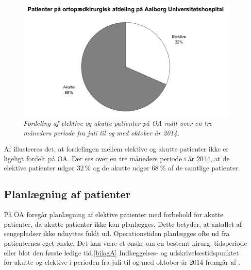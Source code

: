 \begin{figure}[H]
	\flushleft 
	\centering
	\includegraphics[scale=0.55]{figures/elektivvsakut.png}
	\flushleft
	\caption{\textit{Fordeling af elektive og akutte patienter på OA målt over en tre måneders periode fra juli til og med oktober år 2014.}}
	\label{elektivvsakut}
	\end{figure}

\noindent
Af  illustreres det, at fordelingen mellem elektive og akutte patienter ikke er ligeligt fordelt på OA. Der ses over en tre måneders periode i år 2014, at de elektive patienter udgør $32~\%$ og de akutte udgør $68~\%$ af de samtlige patienter. \\

\subsection{Planlægning af patienter} \label{book}
På OA foregår planlægning af elektive patienter med forbehold for akutte patienter, da akutte patienter ikke kan planlægges. Dette betyder, at antallet af sengepladser ikke udnyttes fuldt ud. Operationstiden planlægges ofte ud fra patienternes eget ønske. Det kan være et ønske om en bestemt kirurg, tidsperiode eller blot den første ledige tid.\ref{bilagA} Indlæggelses- og udskrivelsestidspunktet for akutte og elektive i perioden fra juli til og med oktober år 2014 fremgår af . 

